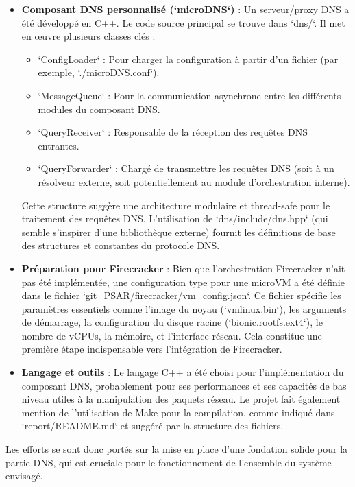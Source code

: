 \documentclass[12pt]{article}
\begin{document}
\begin{itemize}
    \item \textbf{Composant DNS personnalisé (`microDNS`)} : Un serveur/proxy DNS a été développé en C++. Le code source principal se trouve dans `dns/`. Il met en œuvre plusieurs classes clés :
        \begin{itemize}
            \item `ConfigLoader` : Pour charger la configuration à partir d'un fichier (par exemple, `./microDNS.conf`).
            \item `MessageQueue` : Pour la communication asynchrone entre les différents modules du composant DNS.
            \item `QueryReceiver` : Responsable de la réception des requêtes DNS entrantes.
            \item `QueryForwarder` : Chargé de transmettre les requêtes DNS (soit à un résolveur externe, soit potentiellement au module d'orchestration interne).
        \end{itemize}
    Cette structure suggère une architecture modulaire et thread-safe pour le traitement des requêtes DNS. L'utilisation de `dns/include/dns.hpp` (qui semble s'inspirer d'une bibliothèque externe) fournit les définitions de base des structures et constantes du protocole DNS.
    \item \textbf{Préparation pour Firecracker} : Bien que l'orchestration Firecracker n'ait pas été implémentée, une configuration type pour une microVM a été définie dans le fichier `git_PSAR/firecracker/vm_config.json`. Ce fichier spécifie les paramètres essentiels comme l'image du noyau (`vmlinux.bin`), les arguments de démarrage, la configuration du disque racine (`bionic.rootfs.ext4`), le nombre de vCPUs, la mémoire, et l'interface réseau. Cela constitue une première étape indispensable vers l'intégration de Firecracker.
    \item \textbf{Langage et outils} : Le langage C++ a été choisi pour l'implémentation du composant DNS, probablement pour ses performances et ses capacités de bas niveau utiles à la manipulation des paquets réseau. Le projet fait également mention de l'utilisation de Make pour la compilation, comme indiqué dans `report/README.md` et suggéré par la structure des fichiers.
\end{itemize}
Les efforts se sont donc portés sur la mise en place d'une fondation solide pour la partie DNS, qui est cruciale pour le fonctionnement de l'ensemble du système envisagé.
\end{document}
